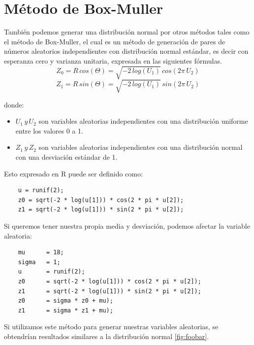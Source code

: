\documentclass[]{article}
\begin{document}
\section{Método de Box-Muller}
También podemos generar una distribución normal por otros métodos tales como el método de Box-Muller, el cual es un método de generación de pares de números aleatorios independientes con distribución normal estándar, es decir con esperanza cero y varianza unitaria, expresada en las siguientes fórmulas.
\[Z_{0} = R\, cos(\Theta ) = \sqrt{-2\, log(U_{1})}\,  cos(2\pi\,  U_{2})\]
\[Z_{1} = R\, sin(\Theta ) = \sqrt{-2\, log(U_{1})}\,  sin(2\pi\,  U_{2})\]

donde:
\begin{itemize}
	\item $U_{1}\, y\, U_{2}$  son variables aleatorias independientes con una distribución uniforme entre los valores 0 a 1.
	\item $Z_{1}\, y\, Z_{2}$ son variables aleatorias independientes con una distribución normal con una desviación estándar
de 1.
\end{itemize}

Esto expresado en R puede ser definido como:
  \begin{lstlisting}
    u = runif(2);
    z0 = sqrt(-2 * log(u[1])) * cos(2 * pi * u[2]);
    z1 = sqrt(-2 * log(u[1])) * sin(2 * pi * u[2]);
   \end{lstlisting}
Si queremos tener nuestra propia media y desviación, podemos afectar la variable aleatoria:
  \begin{lstlisting}
    mu      = 18;
    sigma   = 1;
    u       = runif(2);
    z0      = sqrt(-2 * log(u[1])) * cos(2 * pi * u[2]);
    z1      = sqrt(-2 * log(u[1])) * sin(2 * pi * u[2]);
    z0      = sigma * z0 + mu);
    z1      = sigma * z1 + mu);
   \end{lstlisting}
Si utilizamos este método para generar nuestras variables aleatorias, se obtendrían resultados similares a la distribución normal \autoref{fig:foobar}. 
\end{document}
